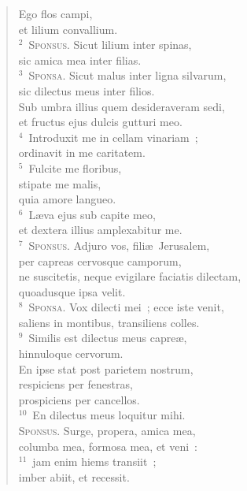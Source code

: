 \begin{flushleft}\begin{verse}\vspace{-19pt}Ego flos campi,\\ et lilium convallium.\\
${}^{2}$~\textsc{Sponsus.} Sicut lilium inter spinas,\\ sic amica mea inter filias.\\
${}^{3}$~\textsc{Sponsa.} Sicut malus inter ligna silvarum,\\ sic dilectus meus inter filios.\\ Sub umbra illius quem desideraveram sedi,\\ et fructus ejus dulcis gutturi meo.\\
${}^{4}$~Introduxit me in cellam vinariam~;\\ ordinavit in me caritatem.\\
${}^{5}$~Fulcite me floribus,\\ stipate me malis,\\ quia amore langueo.\\
${}^{6}$~L\ae va ejus sub capite meo,\\ et dextera illius amplexabitur me.\\
${}^{7}$~\textsc{Sponsus.} Adjuro vos, fili\ae\ Jerusalem,\\ per capreas cervosque camporum,\\ ne suscitetis, neque evigilare faciatis dilectam,\\ quoadusque ipsa velit.\\
${}^{8}$~\textsc{Sponsa.} Vox dilecti mei~; ecce iste venit,\\ saliens in montibus, transiliens colles.\\
${}^{9}$~Similis est dilectus meus capre\ae ,\\ hinnuloque cervorum.\\ En ipse stat post parietem nostrum,\\ respiciens per fenestras,\\ prospiciens per cancellos.\\
${}^{10}$~En dilectus meus loquitur mihi.\\ \textsc{Sponsus.} Surge, propera, amica mea,\\ columba mea, formosa mea, et veni~:\\
${}^{11}$~jam enim hiems transiit~;\\ imber abiit, et recessit.\\

\end{verse}
\end{flushleft}

